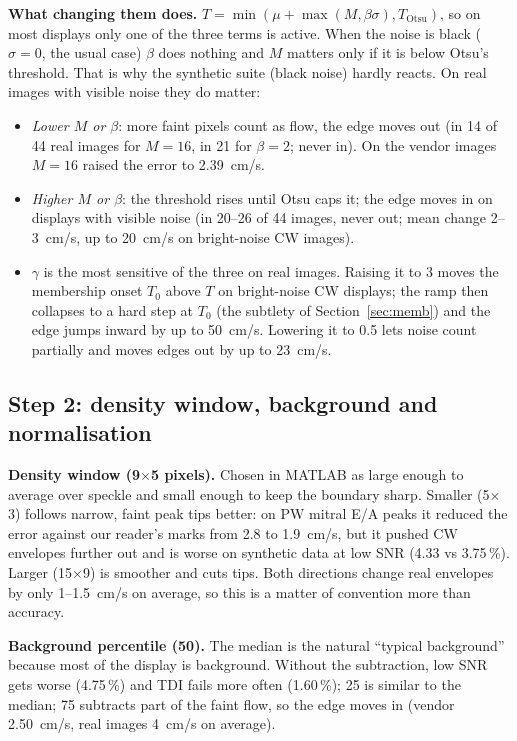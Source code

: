\documentclass[11pt,a4paper]{article}
\begin{document}
\textbf{What changing them does.} $T = \min(\mu + \max(M, \beta\sigma), T_{\mathrm{Otsu}})$, so on most displays only
one of the three terms is active. When the noise is black ($\sigma = 0$, the usual case) $\beta$ does nothing and
$M$ matters only if it is below Otsu's threshold. That is why the synthetic suite (black noise) hardly reacts. On real
images with visible noise they do matter:
\begin{itemize}
\item \emph{Lower $M$ or $\beta$}: more faint pixels count as flow, the edge moves out (in 14 of 44 real images for $M = 16$, in 21
for $\beta = 2$; never in). On the vendor images $M = 16$ raised the error to 2.39~cm/s.
\item \emph{Higher $M$ or $\beta$}: the threshold rises until Otsu caps it; the edge moves in on displays with visible
noise (in 20--26 of 44 images, never out; mean change 2--3~cm/s, up to 20~cm/s on bright-noise CW images).
\item \emph{$\gamma$} is the most sensitive of the three on real images. Raising it to 3 moves the membership onset
$T_0$ above $T$ on bright-noise CW displays; the ramp then collapses to a hard step at $T_0$ (the subtlety of
Section~\ref{sec:memb}) and the edge jumps inward by up to 50~cm/s. Lowering it to 0.5 lets noise count partially
and moves edges out by up to 23~cm/s.
\end{itemize}

\subsection{Step 2: density window, background and normalisation}
\textbf{Density window (9$\times$5 pixels).} Chosen in MATLAB as large enough to average over speckle and small enough
to keep the boundary sharp. Smaller (5$\times$3) follows narrow, faint peak tips better: on PW mitral E/A peaks it
reduced the error against our reader's marks from 2.8 to 1.9~cm/s, but it pushed CW envelopes further out and is
worse on synthetic data at low SNR (4.33 vs 3.75\,\%). Larger (15$\times$9) is smoother and cuts tips. Both directions
change real envelopes by only 1--1.5~cm/s on average, so this is a matter of convention more than accuracy.

\textbf{Background percentile (50).} The median is the natural ``typical background'' because most of the display is
background. Without the subtraction, low SNR gets worse (4.75\,\%) and TDI fails more often (1.60\,\%); 25 is
similar to the median; 75 subtracts part of the faint flow, so the edge moves in (vendor 2.50~cm/s, real images
4~cm/s on average).
\end{document}
